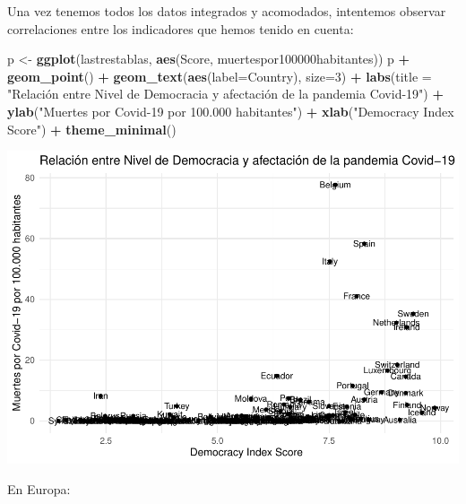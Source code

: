 \documentclass[
]{article}
\newenvironment{Shaded}{\begin{snugshade}}{\end{snugshade}}
\newcommand{\DataTypeTok}[1]{\textcolor[rgb]{0.13,0.29,0.53}{#1}}
\newcommand{\DecValTok}[1]{\textcolor[rgb]{0.00,0.00,0.81}{#1}}
\newcommand{\KeywordTok}[1]{\textcolor[rgb]{0.13,0.29,0.53}{\textbf{#1}}}
\newcommand{\NormalTok}[1]{#1}
\newcommand{\OperatorTok}[1]{\textcolor[rgb]{0.81,0.36,0.00}{\textbf{#1}}}
\newcommand{\StringTok}[1]{\textcolor[rgb]{0.31,0.60,0.02}{#1}}
\begin{document}
Una vez tenemos todos los datos integrados y acomodados, intentemos
observar correlaciones entre los indicadores que hemos tenido en cuenta:

\begin{Shaded}
\begin{Highlighting}[]
\NormalTok{p <-}\StringTok{ }\KeywordTok{ggplot}\NormalTok{(lastrestablas, }\KeywordTok{aes}\NormalTok{(Score, muertespor100000habitantes))}
\NormalTok{p }\OperatorTok{+}\StringTok{ }\KeywordTok{geom_point}\NormalTok{() }\OperatorTok{+}\StringTok{ }\KeywordTok{geom_text}\NormalTok{(}\KeywordTok{aes}\NormalTok{(}\DataTypeTok{label=}\NormalTok{Country), }\DataTypeTok{size=}\DecValTok{3}\NormalTok{) }\OperatorTok{+}
\KeywordTok{labs}\NormalTok{(}\DataTypeTok{title =} \StringTok{"Relación entre Nivel de Democracia y afectación de la pandemia Covid-19"}\NormalTok{) }\OperatorTok{+}
\KeywordTok{ylab}\NormalTok{(}\StringTok{"Muertes por Covid-19 por 100.000 habitantes"}\NormalTok{) }\OperatorTok{+}
\KeywordTok{xlab}\NormalTok{(}\StringTok{"Democracy Index Score"}\NormalTok{) }\OperatorTok{+}\StringTok{ }\KeywordTok{theme_minimal}\NormalTok{()}
\end{Highlighting}
\end{Shaded}

\includegraphics{2020-05-15-corrupcion-y-covid-19_files/figure-latex/unnamed-chunk-6-1.pdf}

En Europa:
\end{document}
